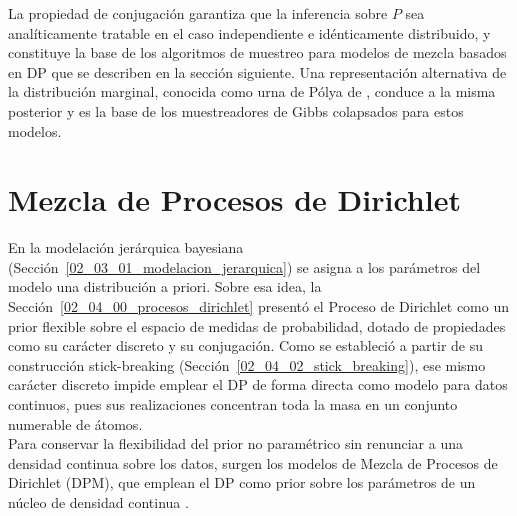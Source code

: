 La propiedad de conjugación garantiza que la inferencia sobre $P$ sea analíticamente tratable en el caso independiente e idénticamente distribuido, y constituye la base de los algoritmos de muestreo para modelos de mezcla basados en DP que se describen en la sección siguiente. Una representación alternativa de la distribución marginal, conocida como urna de Pólya de \citet{02_04_blackwell1973polya}, conduce a la misma posterior y es la base de los muestreadores de Gibbs colapsados para estos modelos.

\section{Mezcla de Procesos de Dirichlet}
\label{02_05_00_mezclas_dpm}
En la modelación jerárquica bayesiana (Sección~\ref{02_03_01_modelacion_jerarquica}) se asigna a los parámetros del modelo una distribución a priori. Sobre esa idea, la Sección~\ref{02_04_00_procesos_dirichlet} presentó el Proceso de Dirichlet como un prior flexible sobre el espacio de medidas de probabilidad, dotado de propiedades como su carácter discreto y su conjugación. Como se estableció a partir de su construcción stick-breaking (Sección~\ref{02_04_02_stick_breaking}), ese mismo carácter discreto impide emplear el DP de forma directa como modelo para datos continuos, pues sus realizaciones concentran toda la masa en un conjunto numerable de átomos.\\

Para conservar la flexibilidad del prior no paramétrico sin renunciar a una densidad continua sobre los datos, surgen los modelos de Mezcla de Procesos de Dirichlet (DPM), que emplean el DP como prior sobre los parámetros de un núcleo de densidad continua \citep{02_04_muller2015bayesian}.

